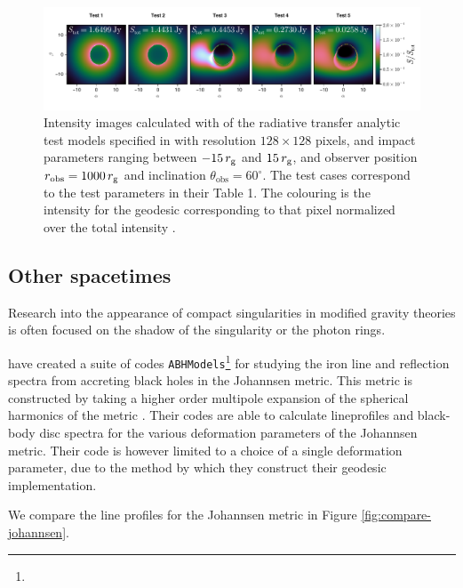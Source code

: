 \documentclass[fleqn,usenatbib]{mnras}
\begin{document}
\begin{figure}
	\centering
	\includegraphics[width=0.99\linewidth]{figures/radiative-transfer.gold.pdf}
	\caption{Intensity images calculated with \Gradus of the radiative transfer analytic test models specified in \citet{gold_verification_2020} with resolution $128 \times 128$ pixels, and impact parameters ranging between $-15\, r_\text{g}$ and $15\, r_\text{g}$, and observer position $r_\text{obs} = 1000\, r_\text{g}$ and inclination $\theta_\text{obs} = 60^\circ$. The test cases correspond to the test parameters in their Table 1. The colouring is the intensity for the geodesic corresponding to that pixel normalized over the total intensity .}
	\label{fig:gold-test-problems}
\end{figure}

\subsection{Other spacetimes}

Research into the appearance of compact singularities in modified gravity theories is often focused on the shadow of the singularity or the photon rings.

\cite{bambi_testing_2017,abdikamalov_testing_2020} have created a suite of codes \texttt{ABHModels}\footnote{} for studying the iron line and reflection spectra from accreting black holes in the Johannsen metric. This metric is constructed by taking a higher order multipole expansion of the spherical harmonics of the metric \citep{johannsen_regular_2013}. Their codes are able to calculate lineprofiles and black-body disc spectra for the various deformation parameters of the Johannsen metric. Their code is however limited to a choice of a single deformation parameter, due to the method by which they construct their geodesic implementation. 

We compare the line profiles for the Johannsen metric in Figure \ref{fig:compare-johannsen}.

\end{document}
